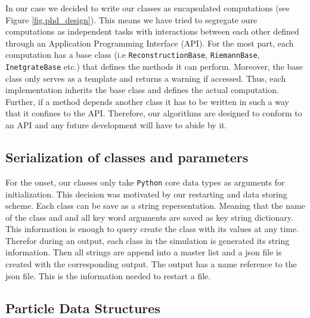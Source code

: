 In our case we decided to write our classes as encapsulated computations (see Figure 
\ref{fig.phd_design}). This means we have
tried to segregate oure computations as independent tasks with interactions between each other
defined through an Application Programming Interface (API). For the most part, each computation
has a base class (i.e \lstinline{ReconstructionBase}, \lstinline{RiemannBase}, 
\lstinline{InetgrateBase} etc.) that
defines the methods it can perform. Moreover, the base class only serves as a template and
returns a warning if accessed. Thus, each implementation inherits the base class and defines
the actual computation. Further, if a method depends another class it has to be written in
such a way that it confines to the API. Therefore, our algorithms are designed to conform to an API
and any future development will have to abide by it.

\subsection{Serialization of classes and parameters}
For the onset, our classes only take \texttt{Python} core data types as arguments for initialization.
This decision was motivated by our restarting and data storing scheme. Each class can be save as
a string repersentation. Meaning that the name of the class and and all key word arguments are
saved as key string dictionary. This information is enough to query create the class with its
values at any time. Therefor during an output, each class in the simulation is generated its
string information. Then all strings are append into a master list and a json file is created
with the corresponding output. The output has a name reference to the json file. This is the information
needed to restart a file.

\subsection{Particle Data Structures}
